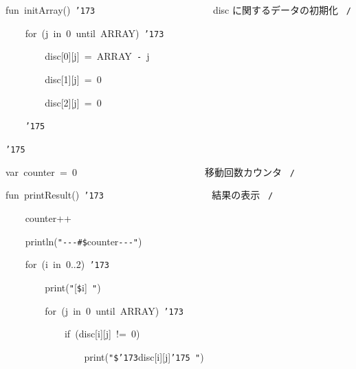 \documentclass{article}
\begin{document}
\noindent
\mbox{}\hfill

\noindent
\mbox{}fun{\tt\mc \ }initArray(){\tt\mc \ }{\tt\char'173}{\tt\mc \ \ \ \ \ \ \ }{\tt\mc \ \ \ \ \ \ \ \ }{\tt\mc \ \ \ \ \ \ \ \ }\rm\mc {\tt /}{\tt *}\  {}disc に関するデータの初期化
					   \hfill \rm\mc \ {\tt *}{\tt /}
\tt\mc 

\noindent
\mbox{}{\tt\mc \ \ \ \ }for{\tt\mc \ }(j{\tt\mc \ }in{\tt\mc \ }0{\tt\mc \ }until{\tt\mc \ }ARRAY){\tt\mc \ }{\tt\char'173}

\noindent
\mbox{}{\tt\mc \ \ \ \ \ \ \ \ }disc[0][j]{\tt\mc \ }={\tt\mc \ }ARRAY{\tt\mc \ }{\tt -}{\tt\mc \ }j

\noindent
\mbox{}{\tt\mc \ \ \ \ \ \ \ \ }disc[1][j]{\tt\mc \ }={\tt\mc \ }0

\noindent
\mbox{}{\tt\mc \ \ \ \ \ \ \ \ }disc[2][j]{\tt\mc \ }={\tt\mc \ }0

\noindent
\mbox{}{\tt\mc \ \ \ \ }{\tt\char'175}

\noindent
\mbox{}{\tt\char'175}

\noindent
\mbox{}\hfill

\noindent
\mbox{}var{\tt\mc \ }counter{\tt\mc \ }={\tt\mc \ }0{\tt\mc \ }{\tt\mc \ \ \ \ \ \ \ \ }{\tt\mc \ \ \ \ \ \ \ \ }{\tt\mc \ \ \ \ \ \ \ \ }\rm\mc {\tt /}{\tt *}\  {}移動回数カウンタ \hfill \rm\mc \ {\tt *}{\tt /}
\tt\mc 

\noindent
\mbox{}\hfill

\noindent
\mbox{}fun{\tt\mc \ }printResult(){\tt\mc \ }{\tt\char'173}{\tt\mc \ \ \ \ \ }{\tt\mc \ \ \ \ \ \ \ \ }{\tt\mc \ \ \ \ \ \ \ \ }\rm\mc {\tt /}{\tt *}\  {}結果の表示 \hfill \rm\mc \ {\tt *}{\tt /}
\tt\mc 

\noindent
\mbox{}{\tt\mc \ \ \ \ }counter++

\noindent
\mbox{}{\tt\mc \ \ \ \ }println({\tt "}{\tt -}{\tt -}{\tt -}{\tt\#}{\tt\$}counter{\tt -}{\tt -}{\tt -}{\tt "})

\noindent
\mbox{}{\tt\mc \ \ \ \ }for{\tt\mc \ }(i{\tt\mc \ }in{\tt\mc \ }0..2){\tt\mc \ }{\tt\char'173}

\noindent
\mbox{}{\tt\mc \ \ \ \ \ \ \ \ }print({\tt "}[{\tt\$}i]{\tt\mc \ }{\tt "})

\noindent
\mbox{}{\tt\mc \ \ \ \ \ \ \ \ }for{\tt\mc \ }(j{\tt\mc \ }in{\tt\mc \ }0{\tt\mc \ }until{\tt\mc \ }ARRAY){\tt\mc \ }{\tt\char'173}

\noindent
\mbox{}{\tt\mc \ \ \ \ \ \ \ \ \ \ \ \ }if{\tt\mc \ }(disc[i][j]{\tt\mc \ }!={\tt\mc \ }0)

\noindent
\mbox{}{\tt\mc \ \ \ \ \ \ \ \ \ \ \ \ \ \ \ \ }print({\tt "}{\tt\$}{\tt\char'173}disc[i][j]{\tt\char'175}{\tt\mc \ }{\tt "})
\end{document}
